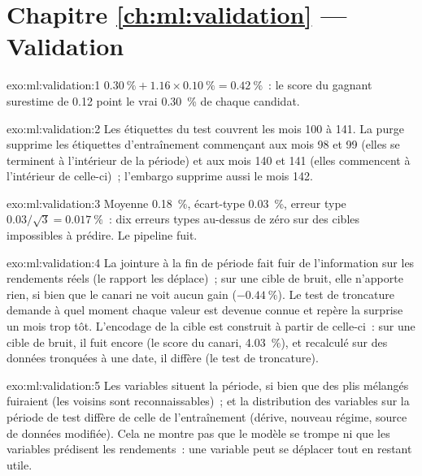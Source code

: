 \section*{Chapitre \ref{ch:ml:validation} --- Validation}

\begin{solution}{exo:ml:validation:1}
$0.30~\% + 1.16\times0.10~\% = 0.42~\%$~: le score du gagnant surestime de 0.12 point le vrai 0.30~\% de chaque candidat.
\end{solution}

\begin{solution}{exo:ml:validation:2}
Les étiquettes du test couvrent les mois 100 à 141. La purge supprime les étiquettes d'entraînement commençant aux mois 98 et 99 (elles se terminent
à l'intérieur de la période) et aux mois 140 et 141 (elles commencent à l'intérieur de celle-ci)~; l'embargo supprime aussi le mois 142.
\end{solution}

\begin{solution}{exo:ml:validation:3}
Moyenne 0.18~\%, écart-type 0.03~\%, erreur type $0.03/\sqrt3 = 0.017~\%$~: dix erreurs types au-dessus de zéro sur
des cibles impossibles à prédire. Le pipeline fuit.
\end{solution}

\begin{solution}{exo:ml:validation:4}
La jointure à la fin de période fait fuir de l'information sur les rendements réels (le rapport les déplace)~; sur une cible de bruit, elle n'apporte
rien, si bien que le canari ne voit aucun gain ($-0.44~\%$). Le test de troncature demande à quel moment chaque valeur est devenue connue et repère la
surprise un mois trop tôt. L'encodage de la cible est construit à partir de celle-ci~: sur une cible de bruit, il fuit encore (le score du
canari, 4.03~\%), et recalculé sur des données tronquées à une date, il diffère (le test de troncature).
\end{solution}

\begin{solution}{exo:ml:validation:5}
Les variables situent la période, si bien que des plis mélangés fuiraient (les voisins sont reconnaissables)~; et la distribution des
variables sur la période de test diffère de celle de l'entraînement (dérive, nouveau régime, source de données modifiée). Cela ne montre pas que le
modèle se trompe ni que les variables prédisent les rendements~: une variable peut se déplacer tout en restant utile.
\end{solution}

